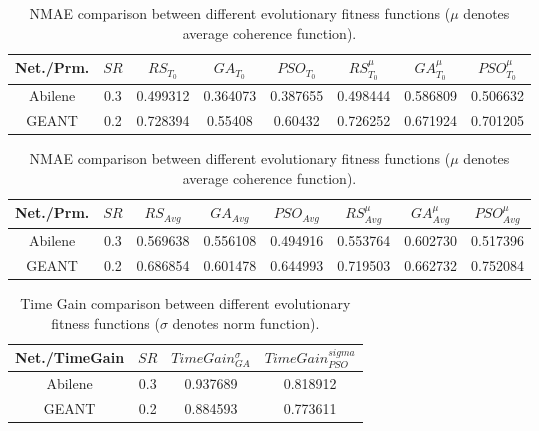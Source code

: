 \begin{table}
	\centering
 \footnotesize{
 \renewcommand{\tabcolsep}{0.05cm}
 \renewcommand{\arraystretch}{1.0}
		\begin{tabular}{| c | c | c | c | c | c | c | c |}
		\hline
       Net./Prm. & $SR$ & $RS_{T_{0}}$ & $GA_{T_{0}}$ & $PSO_{T_{0}}$ & $RS^{\mu}_{T_{0}}$ & $GA^{\mu}_{T_{0}}$ & $PSO^{\mu}_{T_{0}}$  \\ \hline
      Abilene    & 0.3 & 0.499312 & 0.364073 & 0.387655 & 0.498444 & 0.586809 & 0.506632 \\ \hline
      GEANT      & 0.2 & 0.728394 & 0.55408 & 0.60432 & 0.726252 & 0.671924 & 0.701205 \\ \hline
    \end{tabular}
    \newline
\vspace*{0.15cm}
\newline
		\begin{tabular}{| c | c | c | c | c | c | c | c |}
		\hline
       Net./Prm. & $SR$ & $RS_{Avg}$ & $GA_{Avg}$ & $PSO_{Avg}$ & $RS^{\mu}_{Avg}$ & $GA^{\mu}_{Avg}$ & $PSO^{\mu}_{Avg}$  \\ \hline
      Abilene    & 0.3 & 0.569638 & 0.556108 & 0.494916 & 0.553764 & 0.602730 & 0.517396  \\ \hline
      GEANT      & 0.2 & 0.686854 & 0.601478 & 0.644993 & 0.719503 & 0.662732 & 0.752084  \\ \hline
    \end{tabular}
	\caption{\scriptsize{NMAE comparison between different evolutionary fitness functions ($\mu$ denotes average coherence function).}}
	\label{tab:FitFuncCmp1}
}
\end{table}


\begin{table}
	\centering
 \footnotesize{
 \renewcommand{\tabcolsep}{0.05cm}
 \renewcommand{\arraystretch}{1.0}
		\begin{tabular}{| c | c | c | c |}
		\hline
       Net./TimeGain & $SR$ & $Time Gain^{\sigma}_{GA}$ & $Time Gain^{sigma}_{PSO}$ \\ \hline
      Abilene    & 0.3 & 0.937689 & 0.818912  \\ \hline
      GEANT      & 0.2 & 0.884593 & 0.773611  \\ \hline
    \end{tabular}
	\caption{\scriptsize{Time Gain comparison between different evolutionary fitness functions ($\sigma$ denotes norm function).}}
	\label{tab:FitFuncCmp2}
}
\end{table}


